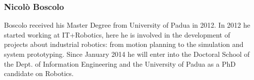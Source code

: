 \documentclass[conference]{IEEEtran}
\begin{document}
\subsubsection*{Nicolò Boscolo}
Boscolo received his Master Degree from University of Padua in 2012. 
In 2012 he started working at IT+Robotics, here he is involved in the development of projects about industrial robotics: from motion planning to the simulation and system prototyping. 
Since January 2014 he will enter into the Doctoral School of the Dept. of Information Engineering and the University of Padua as a PhD candidate on Robotics.
\end{document}
